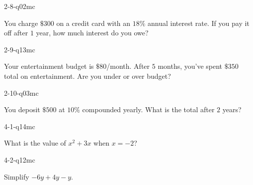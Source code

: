 \begin{practiceQuestion}{2-8-q02}{mc}
\begin{questionText}
You charge $\$300$ on a credit card with an $18\%$ annual interest rate. If you pay it off after $1$ year, how much interest do you owe?
\end{questionText}
\end{practiceQuestion}

\begin{practiceQuestion}{2-9-q13}{mc}
\begin{questionText}
Your entertainment budget is $\$80$/month. After $5$ months, you've spent $\$350$ total on entertainment. Are you under or over budget?
\end{questionText}
\end{practiceQuestion}

\begin{practiceQuestion}{2-10-q03}{mc}
\begin{questionText}
You deposit $\$500$ at $10\%$ compounded yearly. What is the total after $2$ years?
\end{questionText}
\end{practiceQuestion}

\begin{practiceQuestion}{4-1-q14}{mc}
\begin{questionText}
What is the value of $x^2 + 3x$ when $x = -2$?
\end{questionText}
\end{practiceQuestion}

\begin{practiceQuestion}{4-2-q12}{mc}
\begin{questionText}
Simplify $-6y + 4y - y$.
\end{questionText}
\end{practiceQuestion}

